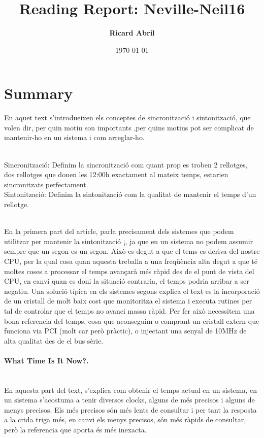 \documentclass[a4paper, 10pt]{article}
\title{Reading Report: Neville-Neil16}
\author{\textbf{Ricard Abril}}
\date{\normalsize\today{}}
\begin{document}
\maketitle


\section{Summary}
En aquet text s'introdueixen els conceptes de sincronització i sintonització, que volen dir, per quin motiu son importants ,per quins motius pot ser complicat de mantenir-ho en un sistema i com arreglar-ho.

\hspace{-0,55cm}\\Sincronització: Definim la sincronització com quant prop es troben 2 rellotges, dos rellotges que donen les 12:00h exactament al mateix temps, estarien sincronitzats perfectament.
\hspace{-0,55cm}\\Sintonització: Definim la sintonització com la qualitat de mantenir el temps d'un rellotge.

\hspace{-0,55cm}\\En la primera part del article, parla precisament dels sistemes que podem utilitzar per mantenir la sintonització ¡, ja que en un sistema no podem assumir sempre que un segon es un segon. Això es degut a que el tems es deriva del nostre CPU, per la qual cosa quan aquesta treballa a una freqüència alta degut a que té moltes coses a processar el temps avançarà més ràpid des de el punt de vista del CPU, en canvi quan es doni la situació contraria, el temps podria arribar a ser negatiu. Una solució típica en els sistemes segons explica el text es la incorporació de un cristall de molt baix cost que monitoritza el sistema i executa rutines per tal de controlar que el temps no avanci massa ràpid. Per fer això necessitem una bona referencia del temps, cosa que aconseguim o comprant un cristall extern que funciona via PCI (molt car però pràctic), o injectant una senyal de 10MHz de alta qualitat des de el bus sèrie.\\


\paragraph{What Time Is It Now?.\\}
\hspace{-0,55cm}\\ En aquesta part del text, s'explica com obtenir el temps actual en un sistema,  en un sistema s'acostuma a tenir diversos clocks, alguns de més precisos i alguns de menys precisos. Els més precisos són més lents de consultar i per tant la resposta a la crida triga més, en canvi els menys precisos, són més ràpids de consultar, però la referencia que aporta és més inexacta.\\\\\\\\
\end{document}
